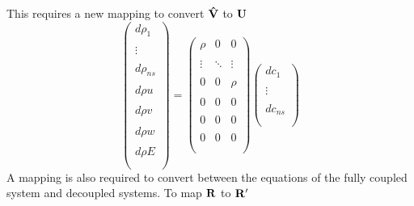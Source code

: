 \documentclass{article}   	%
\begin{document}
This requires a new mapping to convert $\mathbf{\hat{V}}$ to $\mathbf U$
\begin{equation}
  \begin{pmatrix}
 		d \rho_1    \\ \\
		  \vdots    \\ \\
		d \rho_{ns} \\ \\
		d \rho u    \\ \\
		d \rho v    \\ \\
		d \rho w    \\ \\
		d \rho E    \\ \\
	\end{pmatrix} =
  \begin{pmatrix}
    \rho   &    0    & 0      \\ \\
    \vdots & \ddots  & \vdots \\ \\
    0      &    0    & \rho   \\ \\
    0      &    0    & 0      \\ \\
    0      &    0    & 0      \\ \\
    0      &    0    & 0      \\ \\
  \end{pmatrix}
  \begin{pmatrix}
 		d c_1    \\ \\
 		\vdots   \\ \\
    d c_{ns} \\ \\
	\end{pmatrix}
  \label{q-map3}
\end{equation}
A mapping is also required to convert between the equations of the fully coupled
system and decoupled systems.  To map $\mathbf R$ to $\mathbf{R}'$
\end{document}
